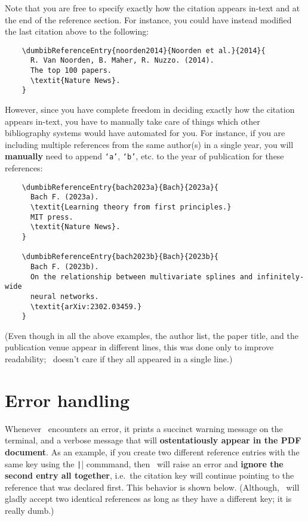 \documentclass[letter, 12pt]{article}
\begin{document}
  Note that you are free to specify exactly how the citation appears in-text and at the end of the reference section. For instance, you could have instead modified the last citation above to the following:
  \begin{verbatim}
    \dumbibReferenceEntry{noorden2014}{Noorden et al.}{2014}{
      R. Van Noorden, B. Maher, R. Nuzzo. (2014).
      The top 100 papers.
      \textit{Nature News}.
    }
  \end{verbatim}
  However, since you have complete freedom in deciding exactly how the citation appears in-text, you have to manually take care of things which other bibliography systems would have automated for you. For instance, if you are including multiple references from the same author(s) in a single year, you will \textbf{manually} need to append \texttt{`a'}, \texttt{`b'}, etc. to the year of publication for these references:
  \begin{verbatim}
    \dumbibReferenceEntry{bach2023a}{Bach}{2023a}{
      Bach F. (2023a).
      \textit{Learning theory from first principles.}
      MIT press.
      \textit{Nature News}.
    }
    
    \dumbibReferenceEntry{bach2023b}{Bach}{2023b}{
      Bach F. (2023b).
      On the relationship between multivariate splines and infinitely-wide
      neural networks.
      \textit{arXiv:2302.03459.}
    }
  \end{verbatim}

  

  (Even though in all the above examples, the author list, the paper title, and the publication venue appear in different lines, this was done only to improve readability; \dumbib\ doesn't care if they all appeared in a single line.) 
  
  \section{Error handling}
  Whenever \dumbib\ encounters an error, it prints a succinct warning message on the terminal, and a verbose message that will \textbf{ostentatiously appear in the PDF document}. As an example, if you create two different reference entries with the same key using the \texttt|\dumbibReferenceEntry{}| commmand, then \dumbib\ will raise an error and \textbf{ignore the second entry all together}, i.e.\ the citation key will continue pointing to the reference that was declared first. This behavior is shown below. (Although, \dumbib\ will gladly accept two identical references as long as they have a different key; it is really dumb.)
\end{document}
